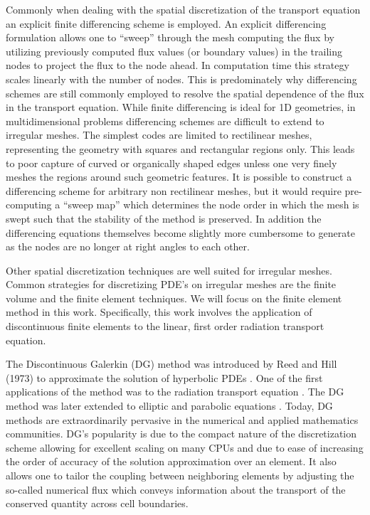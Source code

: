 
Commonly when dealing with the spatial discretization of the transport equation
an explicit finite differencing scheme is employed. An explicit differencing
formulation allows one to ``sweep'' through the mesh computing the flux by utilizing
previously computed flux values (or boundary values) in the trailing nodes to
project the flux to the node ahead.  In computation time this strategy scales
linearly with the number of nodes. This is predominately why differencing
schemes are still commonly employed to resolve the spatial dependence of the
flux in the transport equation. While finite differencing is ideal for 1D
geometries, in multidimensional problems differencing schemes are difficult to
extend to irregular meshes. The simplest codes are limited to rectilinear
meshes, representing the geometry with squares and rectangular regions only.
This leads to poor capture of curved or organically shaped edges unless one
very finely meshes the regions around such geometric features. It is possible
to construct a differencing scheme for arbitrary non rectilinear meshes, but it
would require pre-computing a “sweep map” which determines the node order in
which the mesh is swept such that the stability of the method is preserved. In
addition the differencing equations themselves become slightly more cumbersome
to generate as the nodes are no longer at right angles to each other.

Other spatial discretization techniques are well suited for irregular meshes. Common
strategies for discretizing PDE’s on irregular meshes are the finite volume and
the finite element techniques. We will focus on the finite element method in
this work. Specifically, this work involves the application of discontinuous
finite elements to the linear, first order radiation transport equation.

The Discontinuous Galerkin (DG) method was introduced by Reed and Hill (1973)
to approximate the solution of hyperbolic PDEs \cite{lesaint}. One of the first applications of the
method was to the radiation transport equation \cite{reed}. The
DG method was later extended to elliptic and parabolic equations \cite{riviere}.  Today,
DG methods are extraordinarily pervasive in the numerical and applied mathematics
communities.  DG's popularity is due to the compact nature of the discretization scheme allowing for excellent
scaling on many CPUs and due to ease of increasing the order of accuracy of the
solution approximation over an element.  It also allows one to tailor the coupling between
neighboring elements by adjusting the so-called numerical flux which conveys information
about the transport of the conserved quantity across cell boundaries.

